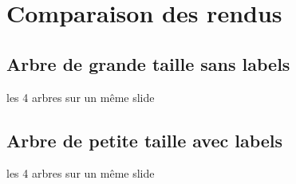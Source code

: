 \section{Comparaison des rendus}

\subsection{Arbre de grande taille sans labels}
\begin{frame}
les 4 arbres sur un même slide
\end{frame}

\subsection{Arbre de petite taille avec labels}
\begin{frame}
les 4 arbres sur un même slide
\end{frame}
